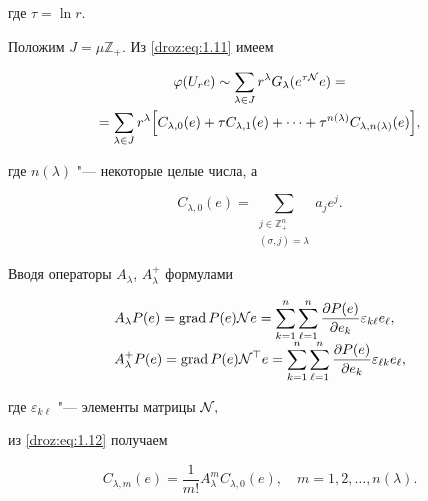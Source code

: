 где $\tau=\ln r.$

Положим $ J=\mu \mathbb Z_{+}.$ Из \eqref{droz:eq:1.11}  имеем

\begin{multline}

\label{droz:eq:1.12} 

\varphi(U_re) \sim \sum_{\lambda \in J}r^{\lambda}G_{\lambda} (e^{\tau{\cal N}}e)= \\ 

=\sum_{\lambda \in J}r^{\lambda}\Bigl[ C_{\lambda,0}(e)+

\tau C_{\lambda,1}(e)+\dots+

\tau^{n(\lambda)}C_{\lambda,n(\lambda)}(e)\Bigr],

\end{multline}

где $ n(\lambda)$ "--- некоторые целые числа, а

$$ C_{\lambda,0}(e)=\sum_{\substack{  j\in {\mathbb Z}_{+}^n\\

(\sigma,j)=\lambda  } }a_je^j.$$

Вводя операторы $A_{\lambda}$, $A_{\lambda}^+$ формулами

\begin{equation}

\label{droz:eq:1.13} 

\begin{array}{l}

\displaystyle 

A_{\lambda}P(e)=\text{grad\,}P(e) {\cal N}e=\sum_{k=1}^n\sum_{\ell=1}^n \frac{\partial P(e)}{\partial e_k} \varepsilon_{k \ell}e_{\ell}, \\

\displaystyle 

A_{\lambda}^+P(e)=\text{grad\,}P(e) {\cal N}^\top e=\sum_{k=1}^n\sum_{\ell=1}^n \frac{\partial P(e)}{\partial e_k} \varepsilon_{\ell k }e_{\ell},

\end{array}

\end{equation}

где $\varepsilon_{k\ell}$ "--- элементы матрицы ${\cal N},$

из \eqref{droz:eq:1.12}   получаем

\begin{equation*}


C_{\lambda, m}(e)= \frac1{m!}A_{\lambda}^mC_{\lambda,0}(e),\quad m=1, 2, \dots, n(\lambda).

\end{equation*}

